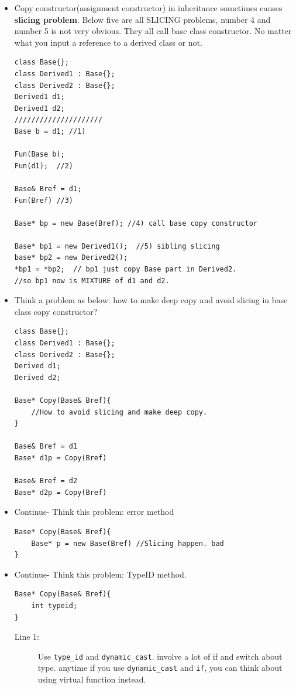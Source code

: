 \documentclass[a4paper,11pt,twoside]{book}
\begin{document}
\begin{itemize}
	\item Copy constructor(assignment constructor) in inheritance sometimes causes \textbf{slicing problem}.   Below five are all SLICING problems, number 4 and number 5 is not very obvious. They all call base class constructor.  No matter what you input a reference to a derived class or not.
\begin{lstlisting}[numbers=none]
class Base{};
class Derived1 : Base{};
class Derived2 : Base{};
Derived1 d1;
Derived1 d2;
/////////////////////
Base b = d1; //1)
	
Fun(Base b);
Fun(d1);  //2)
	
Base& Bref = d1;
Fun(Bref) //3)
	
Base* bp = new Base(Bref); //4) call base copy constructor
	
Base* bp1 = new Derived1();  //5) sibling slicing
base* bp2 = new Derived2();
*bp1 = *bp2;  // bp1 just copy Base part in Derived2.
//so bp1 now is MIXTURE of d1 and d2.
\end{lstlisting}

	
	
\item Think a problem as below: how to make deep copy and avoid slicing in base class copy constructor?
\begin{lstlisting}[numbers=none]
class Base{};
class Derived1 : Base{};
class Derived2 : Base{};
Derived d1;
Derived d2;
	
Base* Copy(Base& Bref){
	//How to avoid slicing and make deep copy.
}
	
Base& Bref = d1
Base* d1p = Copy(Bref)

Base& Bref = d2
Base* d2p = Copy(Bref)
	\end{lstlisting}
	
\item Continue- Think this problem: error method
\begin{lstlisting}[numbers=none]
Base* Copy(Base& Bref){
	Base* p = new Base(Bref) //Slicing happen. bad
}
\end{lstlisting}
	\item Continue- Think this problem: TypeID method.
\begin{lstlisting}[numbers=none]
Base* Copy(Base& Bref){
	int typeid;
}
\end{lstlisting}
\begin{description}
	\item[Line 1:] Use \texttt{type\_id} and \texttt{dynamic\_cast}. involve a lot of if and switch about type. anytime if you use \texttt{dynamic\_cast} and \texttt{if}, you can think about using virtual function instead.
\end{description}
	

\end{itemize}
\end{document}
